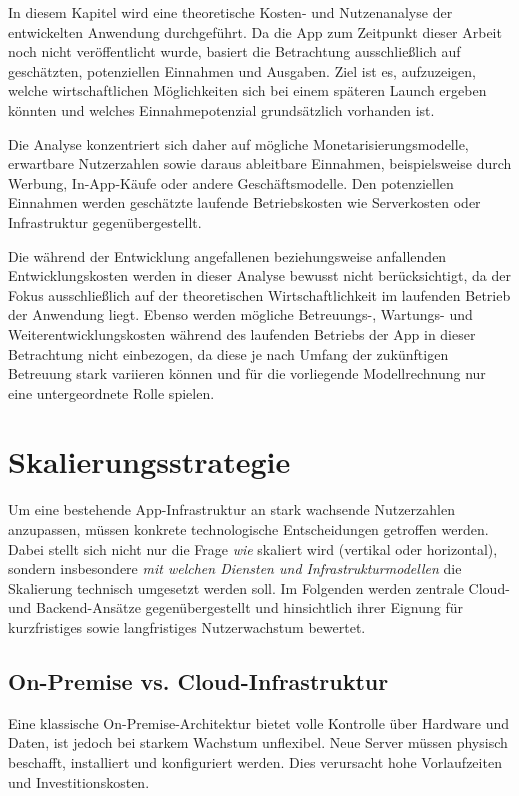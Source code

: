 In diesem Kapitel wird eine theoretische Kosten- und Nutzenanalyse der entwickelten Anwendung durchgeführt. Da die App zum Zeitpunkt dieser Arbeit noch nicht veröffentlicht wurde, basiert die Betrachtung ausschließlich auf geschätzten, potenziellen Einnahmen und Ausgaben. Ziel ist es, aufzuzeigen, welche wirtschaftlichen Möglichkeiten sich bei einem späteren Launch ergeben könnten und welches Einnahmepotenzial grundsätzlich vorhanden ist.

Die Analyse konzentriert sich daher auf mögliche Monetarisierungsmodelle, erwartbare Nutzerzahlen sowie daraus ableitbare Einnahmen, beispielsweise durch Werbung, In-App-Käufe oder andere Geschäftsmodelle. Den potenziellen Einnahmen werden geschätzte laufende Betriebskosten wie Serverkosten oder Infrastruktur gegenübergestellt.

Die während der Entwicklung angefallenen beziehungsweise anfallenden Entwicklungskosten werden in dieser Analyse bewusst nicht berücksichtigt, da der Fokus ausschließlich auf der theoretischen Wirtschaftlichkeit im laufenden Betrieb der Anwendung liegt. Ebenso werden mögliche Betreuungs-, Wartungs- und Weiterentwicklungskosten während des laufenden Betriebs der App in dieser Betrachtung nicht einbezogen, da diese je nach Umfang der zukünftigen Betreuung stark variieren können und für die vorliegende Modellrechnung nur eine untergeordnete Rolle spielen.\section{Skalierungsstrategie}

Um eine bestehende App-Infrastruktur an stark wachsende Nutzerzahlen anzupassen, müssen konkrete technologische Entscheidungen getroffen werden. Dabei stellt sich nicht nur die Frage \emph{wie} skaliert wird (vertikal oder horizontal), sondern insbesondere \emph{mit welchen Diensten und Infrastrukturmodellen} die Skalierung technisch umgesetzt werden soll. Im Folgenden werden zentrale Cloud- und Backend-Ansätze gegenübergestellt und hinsichtlich ihrer Eignung für kurzfristiges sowie langfristiges Nutzerwachstum bewertet.

\subsection{On-Premise vs. Cloud-Infrastruktur}

Eine klassische On-Premise-Architektur bietet volle Kontrolle über Hardware und Daten, ist jedoch bei starkem Wachstum unflexibel. Neue Server müssen physisch beschafft, installiert und konfiguriert werden. Dies verursacht hohe Vorlaufzeiten und Investitionskosten.

